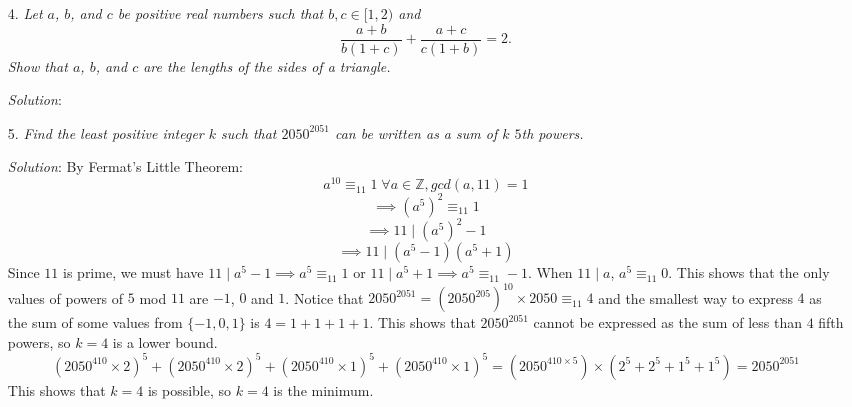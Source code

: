 \documentclass{article}
\begin{document}
\begin{enumerate}[1.]
\item[4.] %
\textit{Let $a$, $b$, and $c$ be positive real numbers such that $b, c \in [1,2)$ and
\[ \frac{a+b}{b(1+c)} +\frac{a+c}{c(1+b)} = 2. \]
Show that $a$, $b$, and $c$ are the lengths of the sides of a triangle.}

\textit{Solution}:
\vspace{6.81mm}

\item[5.] %
\textit{Find the least positive integer $k$ such that $2050^{2051}$ can be written as a sum of $k$ $5$th powers.}

\textit{Solution}: 
By Fermat's Little Theorem: 
$$a^{10} \equiv _{11} 1 \; \forall a \in \mathbb{Z}, gcd(a, 11) = 1$$ 
$$\implies (a^5)^2 \equiv _{11} 1$$
$$\implies 11 \; | \; (a^5)^2 - 1$$
$$\implies 11 \; | \; (a^5 - 1)(a^5 + 1)$$
Since $11$ is prime, we must have $11 \; | \; a^5 - 1 \implies a^5 \equiv _{11} 1$ or $11 \; | \; a^5 + 1 \implies a^5 \equiv _{11} -1$. When $11 \; | \; a$, $a^5 \equiv _{11} 0$.
This shows that the only values of powers of $5$ mod $11$ are $-1$, $0$ and $1$. Notice that $2050^{2051} = (2050^{205})^{10} \times 2050 \equiv _{11} 4$ and the smallest way to express $4$ as the sum of some values from $\{-1, 0, 1\}$ is $4 = 1 + 1 + 1 + 1$.
This shows that $2050^{2051}$ cannot be expressed as the sum of less than $4$ fifth powers, so $k = 4$ is a lower bound.
$$(2050^{410} \times 2)^5 + (2050^{410} \times 2)^5 + (2050^{410} \times 1)^5 + (2050^{410} \times 1)^5 = (2050^{410 \times 5}) \times (2^5 + 2^5 + 1^5 + 1^5) = 2050^{2051}$$
This shows that $k = 4$ is possible, so $k = 4$ is the minimum.

\end{enumerate}
\end{document}
